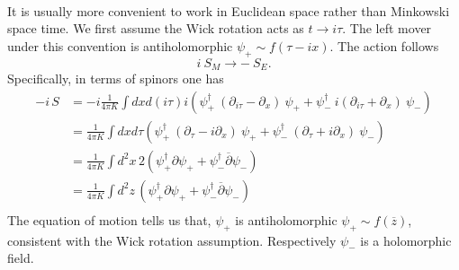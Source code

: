 \documentclass[submission, PhysLectNotes]{SciPost}
\begin{document}
\\
It is usually more convenient to work in Euclidean space rather than Minkowski space time. We first assume the Wick rotation acts as $t \rightarrow i\tau$. The left mover under this convention is antiholomorphic $\psi_{+} \sim f(\tau-ix)$. The action follows
\begin{equation}
    i\ S_M \rightarrow -\ S_E.
\end{equation}
Specifically, in terms of spinors one has
\begin{equation}
	\begin{aligned}
		-i\,S &= -i\frac{1}{4\pi K}\int dx d(i\tau) i\left(\psi_{+}^\dagger \ (\partial_{i\tau} - \partial_x)\ \psi_{+} + \psi_{-}^\dagger \ i(\partial_{i\tau} + \partial_x)\ \psi_{-} \right) \\
		&= \frac{1}{4\pi K}\int dx d\tau \left(\psi_{+}^\dagger \ (\partial_\tau - i\partial_x)\ \psi_{+} + \psi_{-}^\dagger \ (\partial_\tau + i \partial_x)\ \psi_{-} \right) \\
		&= \frac{1}{4\pi K}\int d^2x \,2\left(\psi_{+}^\dagger {\partial} \psi_{+} + \psi_{-}^\dagger \overline{\partial} \psi_{-} \right) \\
		&= \frac{1}{4\pi K}\int d^2z\, \left(\psi_{+}^\dagger {\partial} \psi_{+} + \psi_{-}^\dagger \overline{\partial} \psi_{-} \right) \\
	\end{aligned}
\end{equation}
The equation of motion tells us that, $\psi_{+}$ is antiholomorphic $\psi_{+} \sim f(\overline{z})$, consistent with the Wick rotation assumption. Respectively $\psi_{-}$ is a holomorphic field.
\end{document}
